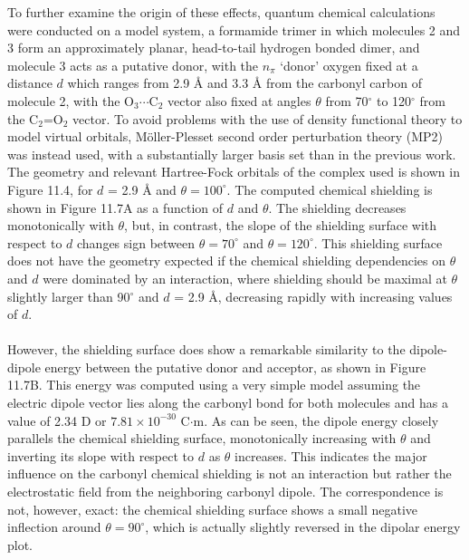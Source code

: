\begin{doublespace}
To further examine the origin of these effects, quantum chemical calculations
were conducted on a model system, a formamide trimer in which molecules 2 and 3
form an approximately planar, head-to-tail hydrogen bonded dimer, and molecule
3 acts as a putative \npistar{} donor, with the $n_\pi$ `donor' oxygen fixed at
a distance $d$ which ranges from 2.9 \r{A} and 3.3 \r{A} from the carbonyl
carbon of molecule 2, with the O$_3\cdots$C$_2$ vector also fixed at angles
$\theta$ from 70$^\circ$ to 120$^\circ$ from the C$_2$=O$_2$ vector. To avoid
problems with the use of density functional theory to model virtual
orbitals, M\"{o}ller-Plesset second order perturbation theory (MP2) was
instead used, with a substantially larger basis set than in the previous work.
The geometry and relevant Hartree-Fock orbitals of the complex used is shown
in Figure 11.4, for $d$ = 2.9 \r{A} and $\theta = 100^\circ$. The computed
chemical shielding is shown in Figure 11.7A as a function of $d$ and $\theta$.
The shielding decreases monotonically with $\theta$, but, in contrast, the
slope of the shielding surface with respect to $d$ changes sign between
$\theta = 70^\circ$ and $\theta = 120^\circ$. This shielding surface does not
have the geometry expected if the chemical shielding dependencies on $\theta$
and $d$ were dominated by an \npipistar{} interaction, where shielding should
be maximal at $\theta$ slightly larger than 90$^\circ$ and $d$ = 2.9 \r{A},
decreasing rapidly with increasing values of $d$.
\\\\
However, the shielding surface does show a remarkable similarity to the
dipole-dipole energy between the putative donor and acceptor, as shown in
Figure 11.7B. This energy was computed using a very simple model assuming the
electric dipole vector lies along the carbonyl bond for both molecules and has
a value of 2.34 D or $7.81 \times 10^{-30}$ C$\cdot$m. As can be seen, the
dipole energy closely parallels the chemical shielding surface, monotonically
increasing with $\theta$ and inverting its slope with respect to $d$ as
$\theta$ increases. This indicates the major influence on the carbonyl \cnmr{}
chemical shielding is not an \npipistar{} interaction but rather the
electrostatic field from the neighboring carbonyl dipole. The correspondence
is not, however, exact: the chemical shielding surface shows a small negative
inflection around $\theta = 90^\circ$, which is actually slightly reversed in
the dipolar energy plot.
\end{doublespace}

